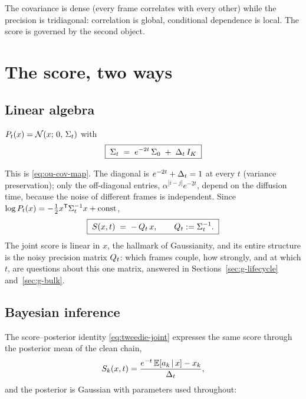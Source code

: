 The covariance is dense (every frame correlates with every other) while
the precision is tridiagonal: correlation is global, conditional
dependence is local. The score is governed by the second object.

\section{The score, two ways}\label{sec:g-score}

\subsection{Linear algebra}

\begin{proposition}\label{prop:g-Sigt}
$P_t(x) = \mathcal{N}(x;\, 0,\, \Sigma_t)$ with
\begin{equation}
  \boxed{\;\Sigma_t \;=\; e^{-2t}\, \Sigma_0 \;+\; \Delta_t\, I_K\;}
  \label{eq:g-Sigt}
\end{equation}
\end{proposition}
This is \eqref{eq:ou-cov-map}. The diagonal is
$e^{-2t} + \Delta_t = 1$ at every $t$ (variance preservation); only the
off-diagonal entries, $\alpha^{|i-j|} e^{-2t}$, depend on the diffusion
time, because the noise of different frames is independent. Since
$\log P_t(x) = -\tfrac{1}{2} x^{\mathsf{T}} \Sigma_t^{-1} x + \text{const}$,
\begin{equation}
  \boxed{\;S(x, t) \;=\; -\,Q_t\, x,
  \qquad Q_t := \Sigma_t^{-1}.\;}
  \label{eq:g-score-matrix}
\end{equation}
The joint score is linear in $x$, the hallmark of Gaussianity, and its
entire structure is the noisy precision matrix $Q_t$: which frames couple,
how strongly, and at which $t$, are questions about this one matrix,
answered in Sections~\ref{sec:g-lifecycle} and~\ref{sec:g-bulk}.

\subsection{Bayesian inference}

The score--posterior identity \eqref{eq:tweedie-joint} expresses the same
score through the posterior mean of the clean chain,
\begin{equation}
  S_k(x, t)
  = \frac{e^{-t}\, \mathbb{E}[a_k \,|\, x] - x_k}{\Delta_t} ,
  \label{eq:g-tweedie}
\end{equation}
and the posterior is Gaussian with parameters used throughout:

